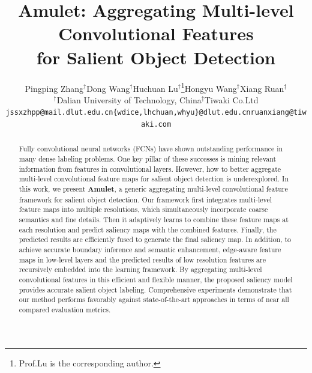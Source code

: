 \documentclass[10pt,twocolumn,letterpaper]{article}
\begin{document}
\title{Amulet: Aggregating Multi-level Convolutional Features \\ for Salient Object Detection}

\author{Pingping Zhang$^{\dagger}$\quad Dong Wang$^{\dagger}$\quad Huchuan Lu$^{\dagger}$\thanks{Prof.Lu is the corresponding author.}\quad Hongyu Wang$^{\dagger}$\quad Xiang Ruan$^{\ddagger}$\\
$^{\dagger}$Dalian University of Technology, China\quad\quad $^{\ddagger}$Tiwaki Co.Ltd\\
{\tt\small jssxzhpp@mail.dlut.edu.cn\quad \{wdice,lhchuan,whyu\}@dlut.edu.cn\quad ruanxiang@tiwaki.com}
}

\maketitle
\thispagestyle{empty}

\begin{abstract}
Fully convolutional neural networks (FCNs) have shown outstanding performance in many dense
labeling problems.
%
One key pillar of these successes is mining relevant information from features in convolutional layers.
%
However, how to better aggregate multi-level convolutional feature maps for salient object detection is underexplored.
%
In this work, we present \textbf{Amulet}, a generic aggregating multi-level convolutional feature framework for salient object detection.
%
Our framework first integrates multi-level feature maps into multiple resolutions, which simultaneously incorporate coarse semantics and fine details.
%
Then it adaptively learns to combine these feature maps at each resolution and predict saliency maps with the combined features. %
Finally, the predicted results are efficiently fused to generate the final saliency map.
%
In addition, to achieve accurate boundary inference and semantic enhancement, edge-aware feature maps in low-level layers and the predicted results of low resolution features are recursively embedded into the learning framework.
%
By aggregating multi-level convolutional features in this efficient and flexible manner, the proposed saliency model provides accurate salient object labeling.
%
Comprehensive experiments demonstrate that our method performs favorably against state-of-the-art approaches in terms of near all compared evaluation metrics.
\end{abstract}
\end{document}

